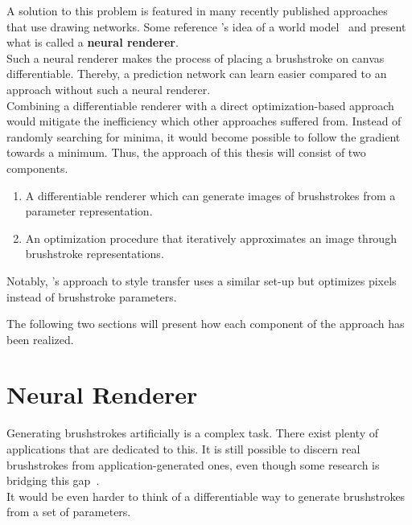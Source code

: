A solution to this problem is featured in many recently published approaches that use drawing networks.
Some reference \citeauthor*{worldmodel}'s idea of a world model~\cite{neuralpainters, learning2paint, strokenet} and present what is called a \textbf{neural renderer}.\\
Such a neural renderer makes the process of placing a brushstroke on canvas differentiable.
Thereby, a prediction network can learn easier compared to an approach without such a neural renderer.\\
Combining a differentiable renderer with a direct optimization-based approach would mitigate the inefficiency which other approaches suffered from.
Instead of randomly searching for minima, it would become possible to follow the gradient towards a minimum.
Thus, the approach of this thesis will consist of two components. \\
\begin{enumerate}
    \item A differentiable renderer which can generate images of brushstrokes from a parameter representation.
    \item An optimization procedure that iteratively approximates an image through brushstroke representations.
\end{enumerate}
Notably, \citeauthor*{gatys}'s approach to style transfer uses a similar set-up but optimizes pixels instead of brushstroke parameters.

The following two sections will present how each component of the approach has been realized.


\section{Neural Renderer}

Generating brushstrokes artificially is a complex task.
There exist plenty of applications that are dedicated to this.
It is still possible to discern real brushstrokes from application-generated ones, even though some research is bridging this gap~\cite{wetbrush}.\\
It would be even harder to think of a differentiable way to generate brushstrokes from a set of parameters.

